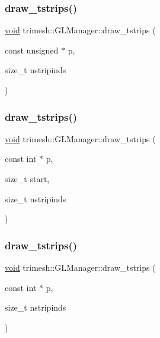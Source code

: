 \subsubsection{\texorpdfstring{draw\+\_\+tstrips()}{draw\_tstrips()}\hspace{0.1cm}{\footnotesize\ttfamily [2/9]}}
{\footnotesize\ttfamily \hyperlink{namespacetrimesh_a784ddfd979e1c579bda795a8edfc3f43}{void} trimesh\+::\+G\+L\+Manager\+::draw\+\_\+tstrips (\begin{DoxyParamCaption}\item[{const unsigned $\ast$}]{p,  }\item[{size\+\_\+t}]{nstripinds }\end{DoxyParamCaption})\hspace{0.3cm}{\ttfamily [inline]}}

\mbox{\label{classtrimesh_1_1GLManager_a8d750067e1ebc52f3cf056625996ec8a}} 
\subsubsection{\texorpdfstring{draw\+\_\+tstrips()}{draw\_tstrips()}\hspace{0.1cm}{\footnotesize\ttfamily [3/9]}}
{\footnotesize\ttfamily \hyperlink{namespacetrimesh_a784ddfd979e1c579bda795a8edfc3f43}{void} trimesh\+::\+G\+L\+Manager\+::draw\+\_\+tstrips (\begin{DoxyParamCaption}\item[{const int $\ast$}]{p,  }\item[{size\+\_\+t}]{start,  }\item[{size\+\_\+t}]{nstripinds }\end{DoxyParamCaption})\hspace{0.3cm}{\ttfamily [inline]}}

\mbox{\label{classtrimesh_1_1GLManager_ad7ef3a9f8ba3ad546669f4774cee0b71}} 
\subsubsection{\texorpdfstring{draw\+\_\+tstrips()}{draw\_tstrips()}\hspace{0.1cm}{\footnotesize\ttfamily [4/9]}}
{\footnotesize\ttfamily \hyperlink{namespacetrimesh_a784ddfd979e1c579bda795a8edfc3f43}{void} trimesh\+::\+G\+L\+Manager\+::draw\+\_\+tstrips (\begin{DoxyParamCaption}\item[{const int $\ast$}]{p,  }\item[{size\+\_\+t}]{nstripinds }\end{DoxyParamCaption})\hspace{0.3cm}{\ttfamily [inline]}}

